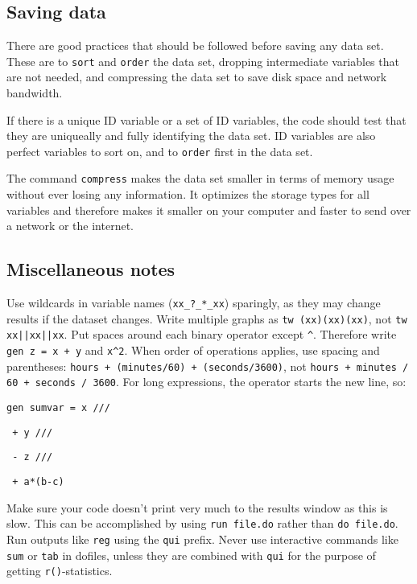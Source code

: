 
\subsection{Saving data}

There are good practices that should be followed before saving any data set.
These are to \texttt{sort} and \texttt{order} the data set,
dropping intermediate variables that are not needed,
and compressing the data set to save disk space and network bandwidth.

If there is a unique ID variable or a set of ID variables,
the code should test that they are uniqueally and
fully identifying the data set.
ID variables are also perfect variables to sort on,
and to \texttt{order} first in the data set.

The command \texttt{compress} makes the data set smaller in terms of memory usage
without ever losing any information.
It optimizes the storage types for all variables
and therefore makes it smaller on your computer
and faster to send over a network or the internet.


\subsection{Miscellaneous notes}

Use wildcards in variable names (\texttt{xx\_?\_*\_xx}) sparingly,
as they may change results if the dataset changes.
Write multiple graphs as \texttt{tw (xx)(xx)(xx)}, not \texttt{tw xx||xx||xx}.
Put spaces around each binary operator except \texttt{\^}.
Therefore write \texttt{gen z = x + y} and \texttt{x\^}\texttt{2}.
When order of operations applies, use spacing and parentheses:
\texttt{hours + (minutes/60) + (seconds/3600)}, not \texttt{hours + minutes / 60 + seconds / 3600}.
For long expressions, the operator starts the new line, so:

\texttt{gen sumvar =   x ///}

\texttt{             + y ///}

\texttt{             - z ///}

\texttt{             + a*(b-c)}

\noindent Make sure your code doesn't print very much to the results window as this is slow.
This can be accomplished by using \texttt{run file.do} rather than \texttt{do file.do}.
Run outputs like \texttt{reg} using the \texttt{qui} prefix.
Never use interactive commands like \texttt{sum} or \texttt{tab} in dofiles,
unless they are combined with \texttt{qui} for the purpose of getting \texttt{r()}-statistics.

\mainmatter
